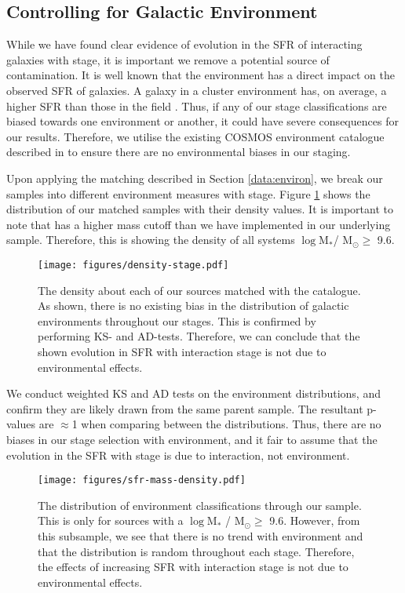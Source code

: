 \documentclass[fleqn,usenatbib]{mnras}
\begin{document}
\subsection{Controlling for Galactic Environment} \label{sec:env-cont}
\noindent While we have found clear evidence of evolution in the SFR of interacting galaxies with stage, it is important we remove a potential source of contamination. It is well known that the environment has a direct impact on the observed SFR of galaxies. A galaxy in a cluster environment has, on average, a higher SFR than those in the field \citep{Papers on environment with SFR}. Thus, if any of our stage classifications are biased towards one environment or another, it could have severe consequences for our results. Therefore, we utilise the existing COSMOS environment catalogue described in \citet{2017ApJ...837...16D} to ensure there are no environmental biases in our staging. 

Upon applying the matching described in Section \ref{data:environ}, we break our samples into different environment measures with stage. Figure \ref{fig:dens-stage} shows the distribution of our matched samples with their density values. It is important to note that \citet{2017ApJ...837...16D} has a higher mass cutoff than we have implemented in our underlying sample. Therefore, this is showing the density of all systems $\log$M$_*$/ M$_\odot \geq$ 9.6. 

\begin{figure}
    \centering
    \texttt{[image: figures/density-stage.pdf]}
    \caption{The density about each of our sources matched with the \citet{2017ApJ...837...16D} catalogue. As shown, there is no existing bias in the distribution of galactic environments throughout our stages. This is confirmed by performing KS- and AD-tests. Therefore, we can conclude that the shown evolution in SFR with interaction stage is not due to environmental effects.}
    \label{fig:dens-stage}
\end{figure}

We conduct weighted KS and AD tests on the environment distributions, and confirm they are likely drawn from the same parent sample. The resultant p-values are $\approx$1 when comparing between the distributions. Thus, there are no biases in our stage selection with environment, and it fair to assume that the evolution in the SFR with stage is due to interaction, not environment.

\begin{figure}
    \centering
    \texttt{[image: figures/sfr-mass-density.pdf]}
    \caption{The distribution of environment classifications through our sample. This is only for sources with a $\log$M$_*$ / M$_\odot \geq$ 9.6. However, from this subsample, we see that there is no trend with environment and that the distribution is random throughout each stage. Therefore, the effects of increasing SFR with interaction stage is not due to environmental effects.}
    \label{fig:dens-sfr-mass}
\end{figure}
\end{document}
